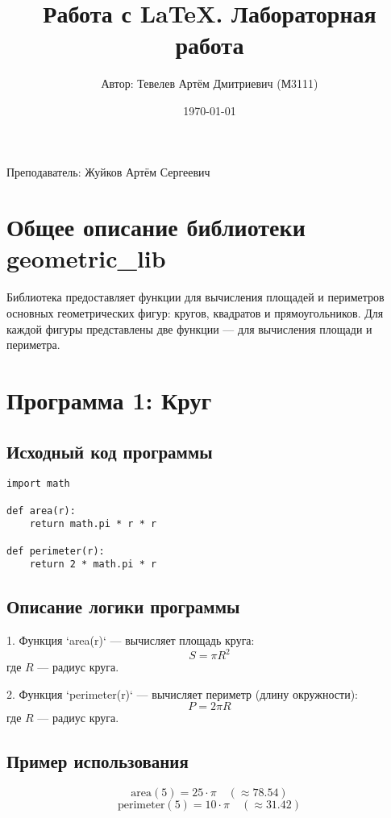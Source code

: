 \documentclass{article}
\author{Автор: Тевелев Артём Дмитриевич (М3111)}
\title{Работа с \LaTeX. Лабораторная работа \textnumero 3}
\date{\today}
\begin{document}
\maketitle
\begin{center}
    {Преподаватель: Жуйков Артём Сергеевич}
\end{center}
\newpage

\tableofcontents
\newpage

\section{Общее описание библиотеки geometric\_lib}

Библиотека предоставляет функции для вычисления площадей и периметров основных геометрических фигур: кругов, квадратов и прямоугольников. Для каждой фигуры представлены две функции — для вычисления площади и периметра.

\section{Программа 1: Круг}

\subsection{Исходный код программы}

\begin{verbatim}
import math

def area(r):
    return math.pi * r * r

def perimeter(r):
    return 2 * math.pi * r
\end{verbatim}

\subsection{Описание логики программы}

1. Функция `area(r)` — вычисляет площадь круга:
   \[
   S = \pi R^2
   \]
   где \( R \) — радиус круга.

2. Функция `perimeter(r)` — вычисляет периметр (длину окружности):
   \[
   P = 2\pi R
   \]
   где \( R \) — радиус круга.

\subsection{Пример использования}

\begin{equation}
\text{area}(5) = 25 \cdot \pi \quad (\approx 78.54)
\end{equation}
\begin{equation}
\text{perimeter}(5) = 10 \cdot \pi \quad (\approx 31.42)
\end{equation}
\end{document}
